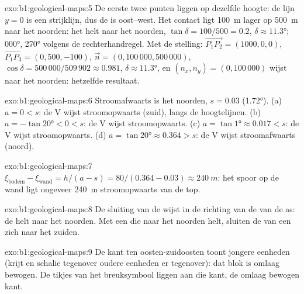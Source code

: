 \begin{solution}{exo:b1:geological-maps:5}
De eerste twee punten liggen op dezelfde hoogte: de lijn $y = 0$ is een strijklijn, dus de  is
oost--west. Het contact ligt \qty{100}{m} lager op \qty{500}{m} naar het noorden: het helt naar het noorden,
$\tan\delta = 100/500 = 0.2$, $\delta \approx \ang{11.3}$;  \ang{000},  \ang{270} volgens de
rechterhandregel. Met de stelling: $\overrightarrow{P_1P_2} = (1000, 0, 0)$,
$\overrightarrow{P_1P_3} = (0, 500, -100)$, $\vec n = (0, 100\,000,
500\,000)$, $\cos\delta = 500\,000/509\,902 \approx 0.981$, $\delta \approx
\ang{11.3}$, en $(n_x, n_y) = (0, 100\,000)$ wijst naar het noorden: hetzelfde resultaat.
\end{solution}

\begin{solution}{exo:b1:geological-maps:6}
Stroomafwaarts is het noorden, $s = 0.03$ (\ang{1.72}). (a) $a = 0 < s$: de V wijst stroomopwaarts
(zuid), langs de hoogtelijnen. (b) $a = -\tan\ang{20} < 0 < s$: de V wijst stroomopwaarts.
(c) $a = \tan\ang{1} \approx 0.017 < s$: de V wijst stroomopwaarts. (d) $a = \tan\ang{20}
\approx 0.364 > s$: de V wijst stroomafwaarts (noord).
\end{solution}

\begin{solution}{exo:b1:geological-maps:7}
$\xi_{\text{bodem}} - \xi_{\text{wand}} = h/(a - s) = 80/(0.364 - 0.03)
\approx \qty{240}{m}$: het spoor op de wand ligt ongeveer \qty{240}{m} stroomopwaarts van
de top.
\end{solution}

\begin{solution}{exo:b1:geological-maps:8}
De sluiting van de  wijst in de richting van de  van de as: de  helt naar het
noorden. Met een  die naar het noorden helt, sluiten de  van een  zich
naar het zuiden.
\end{solution}

\begin{solution}{exo:b1:geological-maps:9}
De kant ten oosten-zuidoosten toont jongere eenheden (krijt en schalie tegenover oudere eenheden
er tegenover): dat blok is omlaag bewogen. De tikjes van het breuksymbool liggen aan die kant, de
omlaag bewogen kant.
\end{solution}

